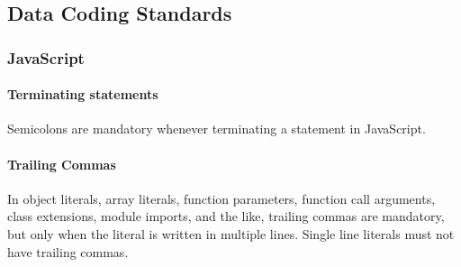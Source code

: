 
\pagebreak


\pagebreak


\subsection{Data Coding Standards}

\subsubsection{JavaScript}
\paragraph{Terminating statements}
Semicolons are mandatory whenever terminating a statement in JavaScript. 

\paragraph{Trailing Commas}
In object literals, array literals, function parameters, function call arguments, class extensions, module imports, and the like, trailing commas are mandatory, but only when the literal is written in multiple lines. Single line literals must not have trailing commas.

